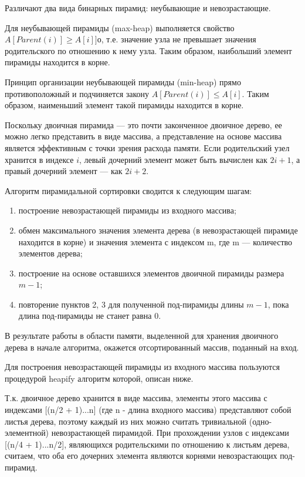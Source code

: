 Различают два вида бинарных пирамид: неубывающие и невозрастающие. 

Для неубывающей пирамиды (max-heap) выполняется свойство \newline $A[Parent(i)] \geqslant A[i]]$о, т.е. значение узла не превышает значения родительского по отношению к нему узла. Таким образом, наибольший элемент пирамиды находится в корне.  

Принцип организации неубывающей пирамиды (min-heap) прямо противоположный и подчиняется закону $A[Parent(i)] \leqslant A[i]$. Таким образом, наименьший элемент такой пирамиды находится в корне.

Поскольку двоичная пирамида — это почти законченное двоичное дерево, ее можно легко представить в виде массива, а представление на основе массива является эффективным с точки зрения расхода памяти. Если родительский узел хранится в индексе $i$, левый дочерний элемент может быть вычислен как $2i + 1$, а правый дочерний элемент — как $2i + 2$.

Алгоритм пирамидальной сортировки сводится к следующим шагам:
\begin{enumerate}
	\item построение невозрастающей пирамиды из входного массива;
	\item обмен максимального значения элемента дерева (в невозрастающей пирамиде находится в корне) и значения элемента с индексом m, где m --- количество элементов дерева;
	\item построение на основе оставшихся элементов двоичной пирамиды размера $m - 1$;
	\item повторение пунктов 2, 3 для полученной под-пирамиды длины $m-1$, пока длина под-пирамиды не станет равна 0.
\end{enumerate} 

В результате работы в области памяти, выделенной для хранения двоичного дерева в начале алгоритма, окажется отсортированный массив, поданный на вход.

Для построения невозрастающей пирамиды из входного массива пользуются процедурой heapify алгоритм которой, описан ниже.

Т.к. двоичное дерево хранится в виде массива, элементы этого массива с индексами [(n/2 + 1)...n] (где n - длина входного массива) представляют собой листья дерева, поэтому каждый из них можно считать тривиальной (одно-элементной) невозрастающей пирамидой. При прохождении узлов с индексами [(n/4 + 1)...n/2], являющихся родительскими по отношению к листьям дерева, считаем, что оба его дочерних элемента являются корнями невозрастающих под-пирамид. 

